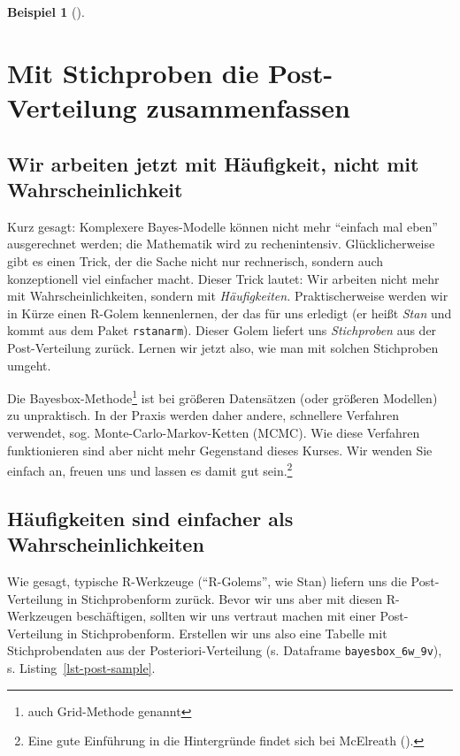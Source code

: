 \documentclass[
  ngerman,
  letterpaper,
  twoside,
  open=any]{scrbook}
\theoremstyle{definition}
\newtheorem{example}{Beispiel}[chapter]
\theoremstyle{plain}
\theoremstyle{definition}
\theoremstyle{definition}
\theoremstyle{remark}
\begin{document}
\begin{example}[]
\section{Mit Stichproben die Post-Verteilung
zusammenfassen}\label{mit-stichproben-die-post-verteilung-zusammenfassen}

\subsection{Wir arbeiten jetzt mit Häufigkeit, nicht mit
Wahrscheinlichkeit}\label{wir-arbeiten-jetzt-mit-huxe4ufigkeit-nicht-mit-wahrscheinlichkeit}

Kurz gesagt: Komplexere Bayes-Modelle können nicht mehr \enquote{einfach
mal eben} ausgerechnet werden; die Mathematik wird zu rechenintensiv.
Glücklicherweise gibt es einen Trick, der die Sache nicht nur
rechnerisch, sondern auch konzeptionell viel einfacher macht. Dieser
Trick lautet: Wir arbeiten nicht mehr mit Wahrscheinlichkeiten, sondern
mit \emph{Häufigkeiten.} Praktischerweise werden wir in Kürze einen
R-Golem kennenlernen, der das für uns erledigt (er heißt \emph{Stan} und
kommt aus dem Paket \texttt{rstanarm}). Dieser Golem liefert uns
\emph{Stichproben} aus der Post-Verteilung zurück. Lernen wir jetzt
also, wie man mit solchen Stichproben umgeht.

Die Bayesbox-Methode\footnote{auch Grid-Methode genannt} ist bei
größeren Datensätzen (oder größeren Modellen) zu unpraktisch. In der
Praxis werden daher andere, schnellere Verfahren verwendet, sog.
Monte-Carlo-Markov-Ketten (MCMC). Wie diese Verfahren funktionieren sind
aber nicht mehr Gegenstand dieses Kurses. Wir wenden Sie einfach an,
freuen uns und lassen es damit gut sein.\footnote{Eine gute Einführung
  in die Hintergründe findet sich bei McElreath
  ().}

\subsection{Häufigkeiten sind einfacher als
Wahrscheinlichkeiten}\label{huxe4ufigkeiten-sind-einfacher-als-wahrscheinlichkeiten}

Wie gesagt, typische R-Werkzeuge (\enquote{R-Golems}, wie Stan) liefern
uns die Post-Verteilung in Stichprobenform zurück. Bevor wir uns aber
mit diesen R-Werkzeugen beschäftigen, sollten wir uns vertraut machen
mit einer Post-Verteilung in Stichprobenform. Erstellen wir uns also
eine Tabelle mit Stichprobendaten aus der Posteriori-Verteilung (s.
Dataframe \texttt{bayesbox\_6w\_9v}), s. Listing~\ref{lst-post-sample}.


\end{example}
\end{document}
